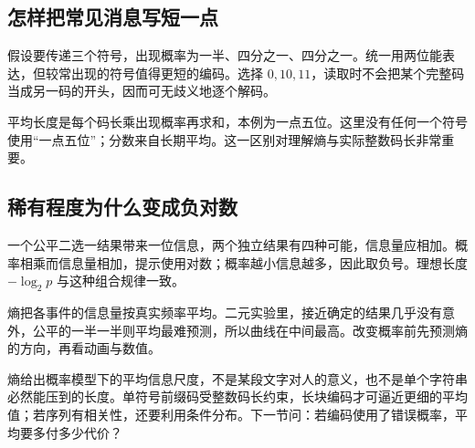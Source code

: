 \subsection*{怎样把常见消息写短一点}
假设要传递三个符号，出现概率为一半、四分之一、四分之一。统一用两位能表达，但较常出现的符号值得更短的编码。选择 $0,10,11$，读取时不会把某个完整码当成另一码的开头，因而可无歧义地逐个解码。

平均长度是每个码长乘出现概率再求和，本例为一点五位。这里没有任何一个符号使用“一点五位”；分数来自长期平均。这一区别对理解熵与实际整数码长非常重要。

\subsection*{稀有程度为什么变成负对数}
一个公平二选一结果带来一位信息，两个独立结果有四种可能，信息量应相加。概率相乘而信息量相加，提示使用对数；概率越小信息越多，因此取负号。理想长度 $-\log_2p$ 与这种组合规律一致。

熵把各事件的信息量按真实频率平均。二元实验里，接近确定的结果几乎没有意外，公平的一半一半则平均最难预测，所以曲线在中间最高。改变概率前先预测熵的方向，再看动画与数值。

熵给出概率模型下的平均信息尺度，不是某段文字对人的意义，也不是单个字符串必然能压到的长度。单符号前缀码受整数码长约束，长块编码才可逼近更细的平均值；若序列有相关性，还要利用条件分布。下一节问：若编码使用了错误概率，平均要多付多少代价？
